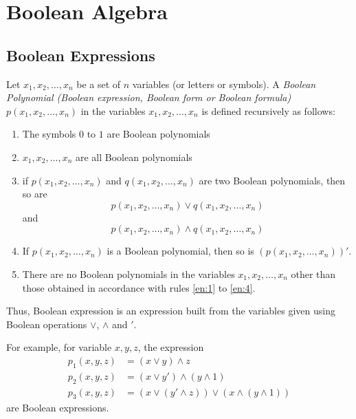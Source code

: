 \documentclass[../main-sheet.tex]{subfiles}
\begin{document}
\chapter{Boolean Algebra}
\section{Boolean Expressions}
\begin{defn}
    Let $ x_1,x_2,\dots,x_n $ be a set of $ n $ variables (or letters or symbols). A \emph{Boolean Polynomial (Boolean expression, Boolean form or Boolean formula)} $ p(x_1,x_2,\dots,x_n) $ in the variables $ x_1,x_2,\dots,x_n $ is defined recursively as follows:
    \begin{enumerate}
        \item The symbols $ 0 $ to $ 1 $ are Boolean polynomials\label{en:1}
        \item $ x_1,x_2,\dots,x_n $ are all Boolean polynomials
        \item if $ p(x_1,x_2,\dots,x_n) $ and $ q(x_1,x_2,\dots,x_n) $ are two Boolean polynomials, then so are
        \[
            p(x_1,x_2,\dots,x_n)\lor q(x_1,x_2,\dots,x_n)
        \]
        and
        \[
            p(x_1,x_2,\dots,x_n)\land q(x_1,x_2,\dots,x_n)
        \]
        \item If $ p(x_1,x_2,\dots,x_n) $ is a Boolean polynomial, then so is $ (p(x_1,x_2,\dots,x_n))' $.\label{en:4}
        \item There are no Boolean polynomials in the variables $ x_1,x_2,\dots,x_n $ other than those obtained in accordance with rules \ref{en:1} to \ref{en:4}.
    \end{enumerate}
\end{defn}
Thus, Boolean expression is an expression built from the variables given using Boolean operations $ \lor $, $ \land $ and $ ' $.


For example, for variable $ x,y,z $, the expression
\begin{align*}
    p_1(x,y,z)&=(x\lor y)\land z\\
    p_2(x,y,z)&=(x\lor y')\land (y\land 1)\\
    p_3(x,y,z)&=(x\lor (y'\land z))\lor (x\land (y\land 1))
\end{align*}
are Boolean expressions.
\end{document}
